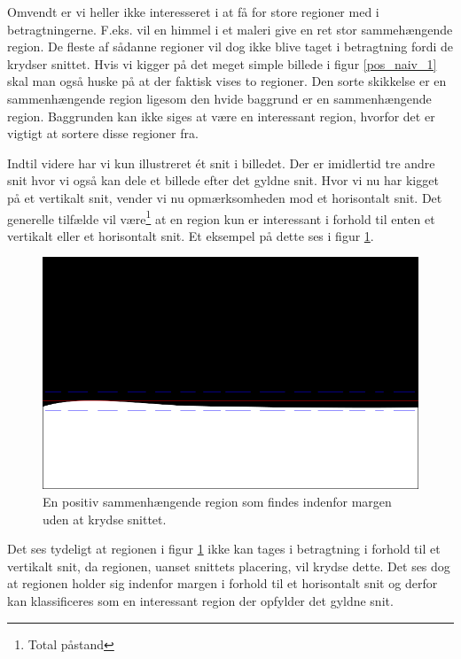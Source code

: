 {Omvendt er vi heller ikke interesseret i at få for store regioner med i
betragtningerne. F.eks. vil en himmel i et maleri give en ret stor
sammehængende region. De fleste af sådanne regioner vil dog ikke blive
taget i betragtning fordi de krydser snittet. Hvis vi kigger på det
meget simple billede i figur \ref{pos_naiv_1} skal man også huske på at
der faktisk vises to regioner. Den sorte skikkelse er en sammenhængende
region ligesom den hvide baggrund er en sammenhængende region.
Baggrunden kan ikke siges at være en interessant region, hvorfor det er
vigtigt at sortere disse regioner fra.

Indtil videre har vi kun illustreret ét snit i billedet. Der er
imidlertid tre andre snit hvor vi også kan dele et billede efter det
gyldne snit. Hvor vi nu har kigget på et vertikalt snit, vender vi nu
opmærksomheden mod et horisontalt snit. Det generelle tilfælde vil
være\footnote{Total påstand} at en region kun er interessant i forhold
til enten et vertikalt eller et horisontalt snit. Et eksempel på dette
ses i figur \ref{pos_horiz_naiv_margin_1}.
\begin{figure}[H]
	\begin{center}
		\includegraphics[scale=\imgscale,angle=0]{afsnit/vores_implementation/billeder/naiv_algoritme/naiv_horiz_positiv_blob_1}
	\end{center}
	\caption[Positiv horisontal region]{En positiv sammenhængende region som findes indenfor
	margen uden at krydse snittet.}
	\label{pos_horiz_naiv_margin_1}
\end{figure}
Det ses tydeligt at regionen i figur \ref{pos_horiz_naiv_margin_1} ikke
kan tages i betragtning i forhold til et vertikalt snit, da regionen,
uanset snittets placering, vil krydse dette. Det ses dog at regionen
holder sig indenfor margen i forhold til et horisontalt snit og derfor
kan klassificeres som en interessant region der opfylder det gyldne
snit.

}
